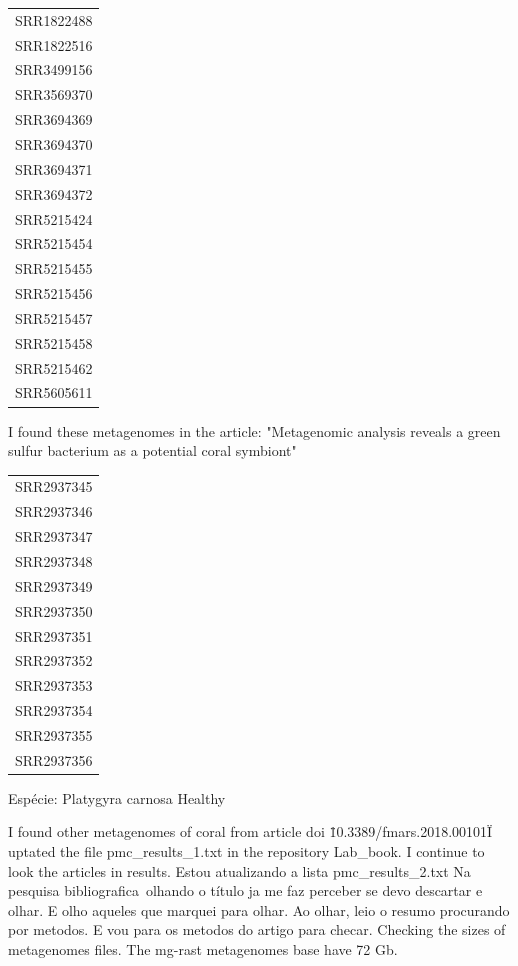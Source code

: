 \documentclass[12pt, a4paper]{report}
\begin{document}
\begin{center}
\begin{longtable}{c}
SRR1822488\\
SRR1822516\\
SRR3499156\\
SRR3569370\\
SRR3694369\\
SRR3694370\\
SRR3694371\\
SRR3694372\\
SRR5215424\\
SRR5215454\\
SRR5215455\\
SRR5215456\\
SRR5215457\\
SRR5215458\\
SRR5215462\\
SRR5605611\\
 \end{longtable}
\end{center}


I found these metagenomes in the article: "Metagenomic analysis reveals a green sulfur bacterium as a potential coral symbiont"

\begin{center}
\begin{longtable}{c}
SRR2937345\\
SRR2937346\\
SRR2937347\\
SRR2937348\\
SRR2937349\\
SRR2937350\\
SRR2937351\\
SRR2937352\\
SRR2937353\\
SRR2937354\\
SRR2937355\\
SRR2937356\\
 \end{longtable}
\end{center}


Espécie: Platygyra carnosa
Healthy

I found other metagenomes of coral from article\: doi \"10.3389/fmars.2018.00101\"
I uptated the file pmc\_results\_1.txt in the repository Lab\_book. I continue to look the articles in results. 
Estou atualizando a lista pmc\_results\_2.txt
Na pesquisa bibliografica\, olhando o título ja me faz perceber se devo descartar e olhar. E olho aqueles que marquei para olhar. Ao olhar, leio o resumo procurando por metodos.  E vou para os metodos do artigo para checar.
Checking the sizes of metagenomes files. The mg-rast metagenomes base have 72 Gb. 
\end{document}

